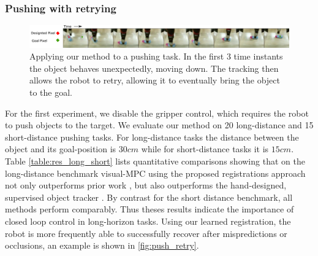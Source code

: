\subsubsection{Pushing with retrying}
\begin{figure}
    \centering
    \includegraphics[width=1.0\textwidth]{images_rfr/push_correction.pdf}
    \caption{\small{Applying our method to a pushing task. In the first 3 time instants the object behaves unexpectedly, moving down. The tracking then allows the robot to retry, allowing it to eventually bring the object to the goal.}}
    \label{fig:push_retry}
\end{figure}



For the first experiment, we disable the gripper control, which requires the robot to push objects to the target. We evaluate our method on 20 long-distance and 15 short-distance pushing tasks. For long-distance tasks the distance between the object and its goal-position is $30cm$ while for short-distance tasks it is $15cm$. Table \ref{table:res_long_short} lists quantitative comparisons showing that on the long-distance benchmark visual-MPC using the proposed registrations approach not only outperforms prior work \cite{sna}, but also outperforms the hand-designed, supervised object tracker \cite{babenko2009visual}. By contrast for the short distance benchmark, all methods perform comparably. Thus theses results indicate the importance of closed loop control in long-horizon tasks. Using our learned registration, the robot is more frequently able to successfully recover after mispredictions or occlusions, an example is shown in \autoref{fig:push_retry}. 


